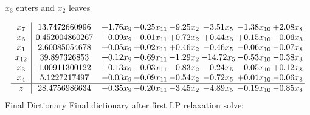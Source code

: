 \documentclass[8pt]{article}
\begin{document}
 $ x_{3} $ enters and $ x_{2} $ leaves 

 \[\begin{array}{c| c c@{\hskip 2pt} c@{\hskip 2pt} c@{\hskip 2pt} c@{\hskip 2pt} c@{\hskip 2pt} c@{\hskip 2pt} }
 x_{7}   &  13.7472660996 & +  1.76 x_{9} & -0.25 x_{11} & -9.25 x_{2} & -3.51 x_{5} & -1.38 x_{10} & +  2.08 x_{8}\\
 x_{6}   &  0.452004860267 & -0.09 x_{9} & -0.01 x_{11} & +  0.72 x_{2} & +  0.44 x_{5} & +  0.15 x_{10} & -0.06 x_{8}\\
 x_{1}   &  2.60085054678 & +  0.05 x_{9} & +  0.02 x_{11} & +  0.46 x_{2} & -0.46 x_{5} & -0.06 x_{10} & -0.07 x_{8}\\
 x_{12}   &  39.897326853 & +  0.12 x_{9} & -0.69 x_{11} & -1.29 x_{2} & -14.72 x_{5} & -0.53 x_{10} & -0.38 x_{8}\\
 x_{3}   &  1.00911300122 & +  0.13 x_{9} & -0.03 x_{11} & -0.83 x_{2} & -0.24 x_{5} & -0.05 x_{10} & +  0.12 x_{8}\\
 x_{4}   &  5.1227217497 & -0.03 x_{9} & -0.09 x_{11} & -0.54 x_{2} & -0.72 x_{5} & +  0.01 x_{10} & -0.06 x_{8}\\
\hline
z    &  28.4756986634 & -0.35 x_{9} & -0.20 x_{11} & -3.45 x_{2} & -4.89 x_{5} & -0.19 x_{10} & -0.85 x_{8}\\
\end{array}\]
Final Dictionary
Final dictionary after first LP relaxation solve: 
\end{document}
